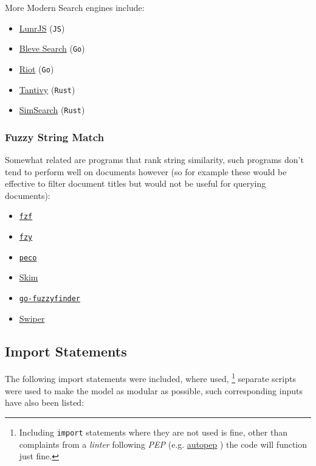 \documentclass[a4paper,11pt,twoside]{article}
\begin{document}
More Modern Search engines include:

\begin{itemize}
\item \href{https://github.com/olivernn/lunr.js/}{LunrJS}  (\texttt{JS}) \cite{nightingaleOlivernnLunrJs2021}
\item \href{https://github.com/blevesearch/bleve}{Bleve Search} (\texttt{Go}) \cite{martyschochBleveSearchDocumentation}
\item \href{https://github.com/go-ego/riot}{Riot} (\texttt{Go}) \cite{vzGoegoRiot2021}
\item \href{https://github.com/tantivy-search/tantivy}{Tantivy} (\texttt{Rust}) \cite{clementrenaultMeilisearchMeiliSearch2021}
\item \href{https://github.com/andylokandy/simsearch-rs}{SimSearch} (\texttt{Rust}) \cite{lokAndylokandySimsearchrs2021}
\end{itemize}


\subsubsection{Fuzzy String Match}
\label{sec:org643c970}
Somewhat related are programs that rank string similarity, such programs don't tend
to perform well on documents however (so for example these would
be effective to filter document titles but would not be useful for
querying documents):

\begin{itemize}
\item \href{https://github.com/junegunn/fzf}{\texttt{fzf}} \cite{choiJunegunnFzf2021}
\item \href{https://github.com/jhawthorn/fzy}{\texttt{fzy}} \cite{hawthornJhawthornFzy2021}
\item \href{https://github.com/peco/peco}{\texttt{peco}} \cite{lestrratPecoPeco2021}
\item \href{https://github.com/lotabout/skim}{Skim} \cite{zhangLotaboutSkim2021}
\item \href{https://github.com/lotabout/skim}{\texttt{go-fuzzyfinder}} \cite{ktrKtr0731Gofuzzyfinder2021}
\item \href{https://github.com/lotabout/skim}{Swiper} \cite{krehelAboaboSwiper2021}
\end{itemize}

\subsection{Import Statements}
\label{sec:orgd262b36}
The following import statements were included, where used, \footnote{Including \texttt{import} statements where they are not used is fine,
other than complaints from a \emph{linter} following \emph{PEP}
\cite{nickcoghlanPEPStyleGuide2001} (e.g. \href{https://pypi.org/project/autopep8/}{autopep}
\cite{hattoriAutopep8ToolThat}) the code will function just fine.}
separate scripts were used to make the model as modular as possible,
such corresponding inputs have also been listed:
\end{document}
